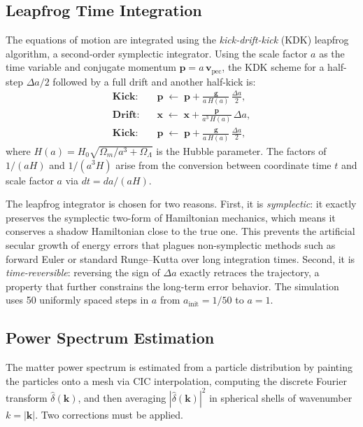 \documentclass[10pt]{article}
\begin{document}
\subsection{Leapfrog Time Integration}

The equations of motion are integrated using the \emph{kick-drift-kick} (KDK) leapfrog algorithm, a second-order symplectic integrator.  Using the scale factor $a$ as the time variable and conjugate momentum $\mathbf{p} = a\,\mathbf{v}_{\mathrm{pec}}$, the KDK scheme for a half-step $\Delta a/2$ followed by a full drift and another half-kick is:
\begin{align}
  \textbf{Kick:}  \quad & \mathbf{p} \;\leftarrow\; \mathbf{p} + \frac{\mathbf{g}}{a\,H(a)}\,\frac{\Delta a}{2}, \\[4pt]
  \textbf{Drift:} \quad & \mathbf{x} \;\leftarrow\; \mathbf{x} + \frac{\mathbf{p}}{a^3\,H(a)}\,\Delta a, \\[4pt]
  \textbf{Kick:}  \quad & \mathbf{p} \;\leftarrow\; \mathbf{p} + \frac{\mathbf{g}}{a\,H(a)}\,\frac{\Delta a}{2},
\end{align}
where $H(a) = H_0\sqrt{\Omega_m/a^3 + \Omega_\Lambda}$ is the Hubble parameter.  The factors of $1/(aH)$ and $1/(a^3 H)$ arise from the conversion between coordinate time $t$ and scale factor $a$ via $dt = da/(aH)$.

The leapfrog integrator is chosen for two reasons.  First, it is \emph{symplectic}: it exactly preserves the symplectic two-form of Hamiltonian mechanics, which means it conserves a shadow Hamiltonian close to the true one.  This prevents the artificial secular growth of energy errors that plagues non-symplectic methods such as forward Euler or standard Runge--Kutta over long integration times.  Second, it is \emph{time-reversible}: reversing the sign of $\Delta a$ exactly retraces the trajectory, a property that further constrains the long-term error behavior.  The simulation uses 50 uniformly spaced steps in $a$ from $a_{\mathrm{init}} = 1/50$ to $a = 1$.

\subsection{Power Spectrum Estimation}

The matter power spectrum is estimated from a particle distribution by painting the particles onto a mesh via CIC interpolation, computing the discrete Fourier transform $\hat{\delta}(\mathbf{k})$, and then averaging $|\hat{\delta}(\mathbf{k})|^2$ in spherical shells of wavenumber $k = |\mathbf{k}|$.  Two corrections must be applied.
\end{document}

